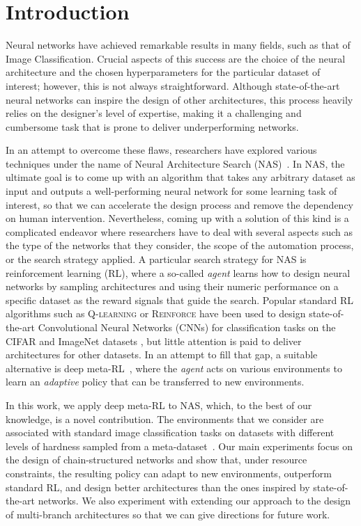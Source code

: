 \section{Introduction}

Neural networks have achieved remarkable results in many fields, such as that of Image Classification. Crucial aspects of this success are the choice of the neural architecture and the chosen hyperparameters for the particular dataset of interest; however, this is not always straightforward. Although state-of-the-art neural networks can inspire the design of other architectures, this process heavily relies on the designer's level of expertise, making it a challenging and cumbersome task that is prone to deliver underperforming networks.

In an attempt to overcome these flaws, researchers have explored various techniques under the name of Neural Architecture Search (NAS)~\citep{NASsurvey}. In NAS, the ultimate goal is to come up with an algorithm that takes any arbitrary dataset as input and outputs a well-performing neural network for some learning task of interest, so that we can accelerate the design process and remove the dependency on human intervention. Nevertheless, coming up with a solution of this kind is a complicated endeavor where researchers have to deal with several aspects such as the type of the networks that they consider, the scope of the automation process, or the search strategy applied. A particular search strategy for NAS is reinforcement learning (RL), where a so-called \textit{agent} learns how to design neural networks by sampling architectures and using their numeric performance on a specific dataset as the reward signals that guide the search. Popular standard RL algorithms such as \textsc{Q-learning} or \textsc{Reinforce} have been used to design state-of-the-art Convolutional Neural Networks (CNNs) for classification tasks on the CIFAR and ImageNet datasets \citep{ENAS, PathNAS, BlockQNN, ZophNAS1, BakerNAS}, but little attention is paid to deliver architectures for other datasets. In an attempt to fill that gap, a suitable alternative is deep meta-RL~\citep{LtRL, RL2}, where the \textit{agent} acts on various environments to learn an \textit{adaptive} policy that can be transferred to new environments.

In this work, we apply deep meta-RL to NAS, which, to the best of our knowledge, is a novel contribution. The environments that we consider are associated with standard image classification tasks on datasets with different levels of hardness sampled from a meta-dataset~\citep{MetaDataset}. Our main experiments focus on the design of chain-structured networks and show that, under resource constraints, the resulting policy can adapt to new environments, outperform standard RL, and design better architectures than the ones inspired by state-of-the-art networks. We also experiment with extending our approach to the design of multi-branch architectures so that we can give directions for future work.


